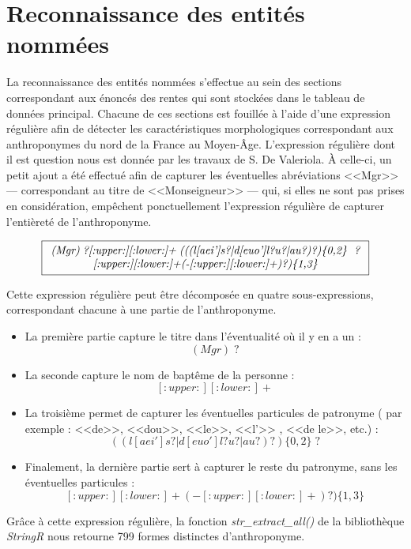 
\section{Reconnaissance des entités nommées}
La reconnaissance des entités nommées s'effectue au sein des sections correspondant aux énoncés des rentes qui sont stockées dans le tableau de données principal. Chacune de ces sections est fouillée à l'aide d'une expression régulière afin de détecter les caractéristiques morphologiques correspondant aux anthroponymes du nord de la France au Moyen-Âge.
\newpage
L'expression régulière dont il est question nous est donnée par les travaux de S. De Valeriola. À celle-ci, un petit ajout a été effectué afin de capturer les éventuelles abréviations <<Mgr>>  ---  correspondant au titre de <<Monseigneur>> --- qui, si elles ne sont pas prises en considération, empêchent ponctuellement l'expression régulière de capturer l'entièreté de l'anthroponyme.

\[
    \boxed{
        \begin{array}{c}
        \textit{(Mgr)\;?[:upper:][:lower:]+\;(((l[aei']s?|d[euo']l?u?|au?)?)\{0,2\} \;?}\\
        \textit{[:upper:][:lower:]+(-[:upper:][:lower:]+)?)\{1,3\}}
        \end{array}
    }
\]

Cette expression régulière peut être décomposée en quatre sous-expressions, correspondant chacune à une partie de l'anthroponyme.
\begin{itemize}
    \item La première partie capture le titre  dans l'éventualité où il y en a un : \[(Mgr)\; ?\]
    \item La seconde capture le nom de baptême de la personne : \[[:upper:][:lower:]+\]
    \item La troisième permet de capturer les éventuelles particules de patronyme ( par exemple : <<de>>, <<dou>>, <<le>>, <<l'>> , <<de le>>, etc.) : \[ ((l[aei']s?|d[euo']l?u?|au?)?)\{0,2\}\;?\] 
    \item Finalement, la dernière partie sert à capturer le reste du patronyme, sans les éventuelles particules : \[[:upper:][:lower:]+(-[:upper:][:lower:]+)?)\{1,3\}\] 
\end{itemize}

Grâce à cette expression régulière, la fonction \textit{str\_extract\_all()} de la bibliothèque \textit{StringR} nous retourne 799 formes distinctes d'anthroponyme. 



